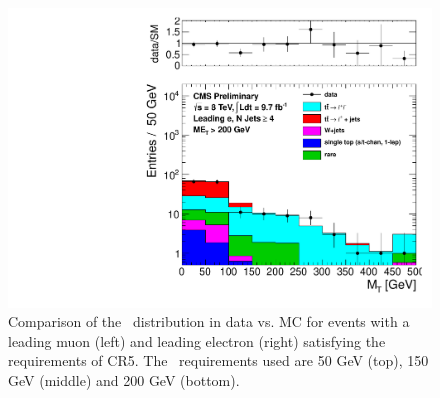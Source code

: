 \begin{figure}[hbt]
\begin{center}
        \includegraphics[width=0.5\linewidth]{plots/CR5plots/mt_met200_leadele_nj4.pdf}
    \caption{
      Comparison of the \mt\ distribution in data vs. MC for events
      with a leading muon (left) and leading electron (right)
      satisfying the requirements of CR5. The \met\ requirements used are
      50 GeV (top), 150 GeV (middle) and 200 GeV (bottom).
\label{fig:cr5mtrest} 
}  
      \end{center}
\end{figure}



